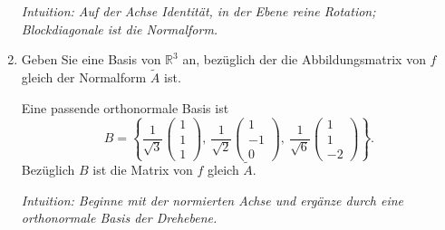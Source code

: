 \documentclass[11pt, a4paper]{article}
\begin{document}
\begin{enumerate}
\begin{framed}
  \medskip\noindent\textit{Intuition: Auf der Achse Identität, in der Ebene reine Rotation; Blockdiagonale ist die Normalform.}
  \end{framed}
  \item Geben Sie eine Basis von $\mathbb{R}^3$ an, bezüglich der die Abbildungsmatrix von $f$ gleich der Normalform $\tilde A$ ist.
  \begin{framed}
  Eine passende orthonormale Basis ist
  \[
  B=\left\{
  \frac{1}{\sqrt3}\!\begin{pmatrix}1\\1\\1\end{pmatrix},\
  \frac{1}{\sqrt2}\!\begin{pmatrix}1\\-1\\0\end{pmatrix},\
  \frac{1}{\sqrt6}\!\begin{pmatrix}1\\1\\-2\end{pmatrix}
  \right\}.
  \]
  Bezüglich $B$ ist die Matrix von $f$ gleich $\tilde A$.

  \medskip\noindent\textit{Intuition: Beginne mit der normierten Achse und ergänze durch eine orthonormale Basis der Drehebene.}
  \end{framed}
\end{enumerate}
\end{document}
